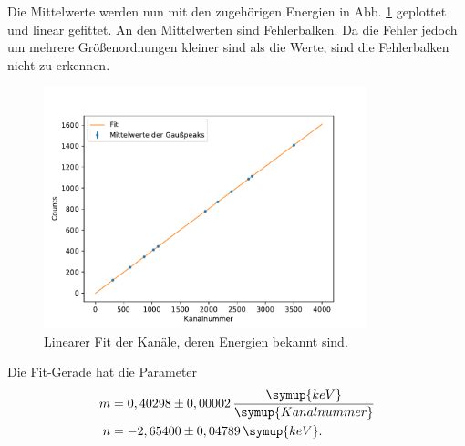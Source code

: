     Die Mittelwerte werden nun mit den zugehörigen Energien
    in Abb. \ref{fig:regression} geplottet und
    linear gefittet. An den Mittelwerten sind Fehlerbalken.
    Da die Fehler jedoch um mehrere Größenordnungen kleiner sind als die
    Werte, sind die Fehlerbalken nicht zu erkennen.


    \begin{figure}[H]
      \centering
      \includegraphics[height=7cm]{germania/regression/regression.pdf}
      \caption{Linearer Fit der Kanäle, deren Energien bekannt sind.}
      \label{fig:regression}
    \end{figure}

    Die Fit-Gerade hat die Parameter
    \begin{align*}
      m &= 0,40298\pm 0,00002 \,\frac{\symup{keV}}{\symup{Kanalnummer}}\\
      n &= -2,65400\pm 0,04789 \,\symup{keV}.
    \end{align*}

